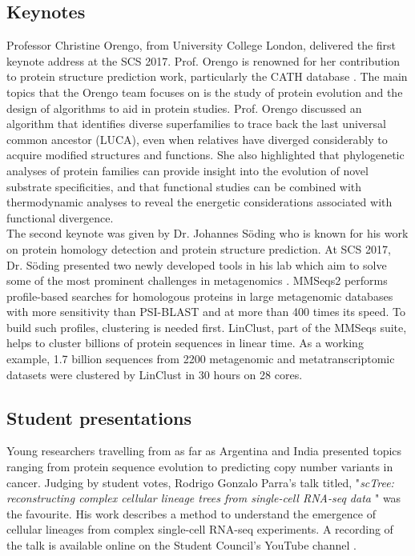 \documentclass[]{article}%
\begin{document}
	
	\subsection*{Keynotes}
	
	Professor Christine Orengo, from University College London, delivered the first keynote address at the SCS 2017. Prof. Orengo is renowned for her contribution to protein structure prediction work, particularly the CATH database \citep{cathdb}. The main topics that the Orengo team focuses on is the study of protein evolution and the design of algorithms to aid in protein studies. Prof. Orengo discussed an algorithm that identifies diverse superfamilies to trace back the last universal common ancestor (LUCA), even when relatives have diverged considerably to acquire modified structures and functions. She also highlighted that phylogenetic analyses of protein families can provide insight into the evolution of novel substrate specificities, and that functional studies can be combined with thermodynamic analyses to reveal the energetic considerations associated with functional divergence.\\
	
	The second keynote was given by Dr. Johannes Söding who is known for his work on protein homology detection and protein structure prediction. At SCS 2017, Dr. Söding presented two newly developed tools in his lab which aim to solve some of the most prominent challenges in metagenomics \citep{MMseqs2}. MMSeqs2 performs profile-based searches for homologous proteins in large metagenomic databases with more sensitivity than PSI-BLAST and at more than 400 times its speed. To build such profiles, clustering is needed first. LinClust, part of the MMSeqs suite, helps to cluster billions of protein sequences in linear time. As a working example, 1.7 billion sequences from 2200 metagenomic and metatranscriptomic datasets were clustered by LinClust in 30 hours on 28 cores.\\
	
	
	\subsection*{Student presentations} 
	
	Young researchers travelling from as far as Argentina and India presented topics ranging from protein sequence evolution to predicting copy number variants in cancer. Judging by student votes, Rodrigo Gonzalo Parra's talk titled, "\textit{scTree: reconstructing complex cellular lineage trees from single-cell RNA-seq data \citep{gonza2017}}" was the favourite. His work describes a method to understand the emergence of cellular lineages from complex single-cell RNA-seq experiments. A recording of the talk is available online on the Student Council’s YouTube channel \citep{parra2017youtube}.\\
	
\end{document}
